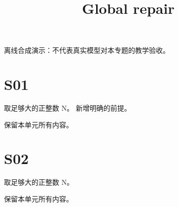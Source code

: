 \documentclass[UTF8,fontset=fandol,11pt]{ctexart}
\title{Global repair}
\date{}
\begin{document}
\maketitle
\par\noindent 离线合成演示：不代表真实模型对本专题的教学验收。\par
\section{S01}\label{sec:S01}
取足够大的正整数 N。 新增明确的前提。\par
保留本单元所有内容。\par
\section{S02}\label{sec:S02}
取足够大的正整数 N。\par
保留本单元所有内容。\par
\end{document}
